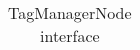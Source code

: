 \begin{table}[h!]
\begin{center}
\begin{tabular}{||r|l|l||}
		
		\end{tabular}
		\caption{\label{table:tmn-interface} TagManagerNode interface}
	\end{center}
\end{table}
